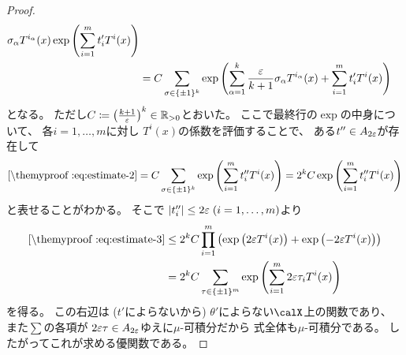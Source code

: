 \documentclass[report]{jlreq}
\begin{document}
\begin{proof}
\begin{alignat}{1}
{                            \sigma_\alpha
                            T^{i_\alpha}(x)
                    }
                \exp\myparen{
                    \sum_{i = 1}^m
                    t'_i T^i(x)
                }
                \\
            &=
                C
                \sum_{\sigma \in \{ \pm 1 \}^k}
                    \exp\myparen{
                        \sum_{\alpha = 1}^k
                            \frac{\eps}{k + 1}
                            \sigma_\alpha
                            T^{i_\alpha}(x)
                        + \sum_{i = 1}^m
                            t'_i T^i(x)
                    }
                \locallabel{eq:estimate-2}
    \end{alignat}
    となる。
    ただし$C \coloneqq \left({\frac{k + 1}{\varepsilon}}\right)^k \in \mathbb{R}_{> 0}$とおいた。
    ここで最終行の$\exp$の中身について、
    各$i = 1, \dots, m$に対し
    $T^i(x)$の係数を評価することで、
    ある$t'' \in A_{2\varepsilon}$が存在して
    \begin{equation}
        \localcref{eq:estimate-2}
            =
                C
                \sum_{\sigma \in \{ \pm 1 \}^k}
                    \exp\myparen{
                        \sum_{i = 1}^m
                            t''_i T^i(x)
                    }
            =
                2^k C
                    \exp\myparen{
                        \sum_{i = 1}^m
                            t''_i T^i(x)
                    }
                \locallabel{eq:estimate-3}
    \end{equation}
    と表せることがわかる。
    そこで
    $|t''_i| \le 2\varepsilon \; (i = 1, \dots, m)$より
    \begin{alignat}{1}
        \localcref{eq:estimate-3}
            &\le
                2^k C
                \prod_{i = 1}^m
                    \myparen{
                        \exp\myparen{
                            2\eps
                            T^i(x)
                        }
                        + \exp\myparen{
                            - 2\eps
                            T^i(x)
                        }
                    }
                \\
            &=
                2^k C
                \sum_{\tau \in \{ \pm 1 \}^m}
                    \exp\myparen{
                        \sum_{i = 1}^m
                            2\eps
                            \tau_i
                            T^i(x)
                    }
    \end{alignat}
    を得る。
    この右辺は
    ($t'$によらないから) $\theta'$によらない$\calX$上の関数であり、
    また$\sum$の各項が
    $2\varepsilon \tau \in A_{2\varepsilon}$ゆえに$\mu$-可積分だから
    式全体も$\mu$-可積分である。
    したがってこれが求める優関数である。
\end{proof}
\end{document}
